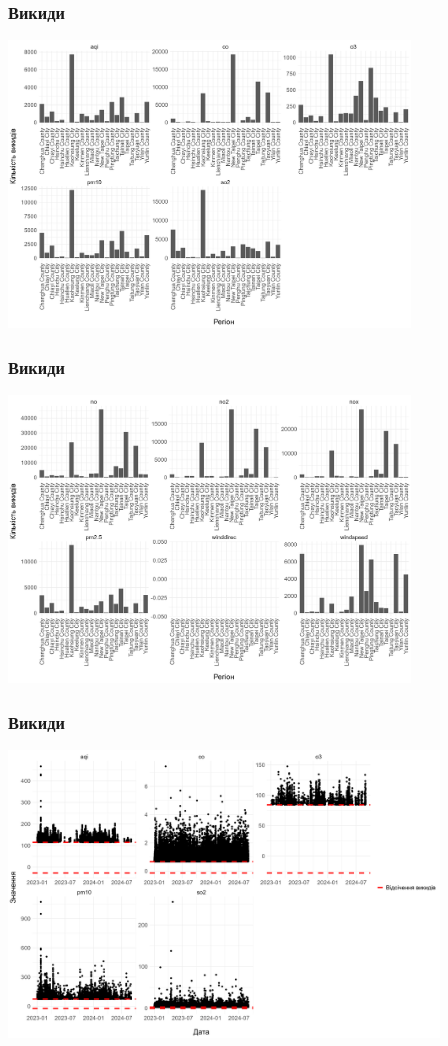 \documentclass{beamer}
\begin{document}
\begin{frame}
  \frametitle{Викиди}

  \begin{center}
    \includegraphics[height=3in]{plots/outliers/count-bar-county-p1.png}
  \end{center}
\end{frame}

\begin{frame}
  \frametitle{Викиди}

  \begin{center}
    \includegraphics[height=3in]{plots/outliers/count-bar-county-p2.png}
  \end{center}
\end{frame}

\begin{frame}
  \frametitle{Викиди}

  \begin{center}
    \includegraphics[height=3in]{plots/outliers/scatter-p1.png}
  \end{center}
\end{frame}
\end{document}
